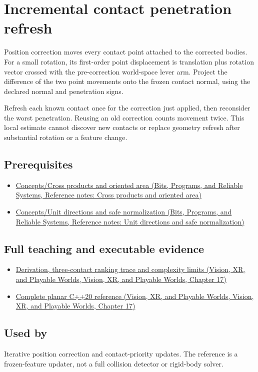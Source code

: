\hypertarget{appendix-f682275acbdf}{}\label{referencestart:appendix-f682275acbdf}
\section{Incremental contact penetration refresh}\label{appendix-f682275acbdf-incremental-contact-penetration-refresh}

Position correction moves every contact point attached to the corrected bodies. For a small rotation, its first-order point displacement is translation plus rotation vector crossed with the pre-correction world-space lever arm. Project the difference of the two point movements onto the frozen contact normal, using the declared normal and penetration signs.

Refresh each known contact once for the correction just applied, then reconsider the worst penetration. Reusing an old correction counts movement twice. This local estimate cannot discover new contacts or replace geometry refresh after substantial rotation or a feature change.

\subsection{Prerequisites}\label{appendix-f682275acbdf-prerequisites}

\begin{itemize}
\tightlist
\item
  \href{../01-Bits-Programs-and-Reliable-Systems/main.pdf\#nameddest=appendix-2391db8052b1}{Concepts/Cross products and oriented area (Bits, Programs, and Reliable Systems, Reference notes: Cross products and oriented area)}
\item
  \href{../01-Bits-Programs-and-Reliable-Systems/main.pdf\#nameddest=appendix-f744e41b95b4}{Concepts/Unit directions and safe normalization (Bits, Programs, and Reliable Systems, Reference notes: Unit directions and safe normalization)}
\end{itemize}

\subsection{Full teaching and executable evidence}\label{appendix-f682275acbdf-full-teaching-and-executable-evidence}

\begin{itemize}
\tightlist
\item
  \href{../07-Vision-XR-and-Playable-Worlds/main.pdf\#nameddest=06-engine-ii-ch046-refresh-neighboring-penetrations-after-position-correction}{Derivation, three-contact ranking trace and complexity limits (Vision, XR, and Playable Worlds, Vision, XR, and Playable Worlds, Chapter 17)}
\item
  \href{../07-Vision-XR-and-Playable-Worlds/main.pdf\#nameddest=06-engine-ii-ch046-a-planar-penetration-refresh-witness}{Complete planar C++20 reference (Vision, XR, and Playable Worlds, Vision, XR, and Playable Worlds, Chapter 17)}
\end{itemize}

\subsection{Used by}\label{appendix-f682275acbdf-used-by}

Iterative position correction and contact-priority updates. The reference is a frozen-feature updater, not a full collision detector or rigid-body solver.
